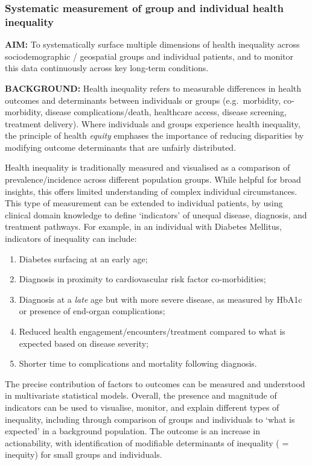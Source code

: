 \documentclass[
  letterpaper,
  DIV=11,
  numbers=noendperiod]{scrartcl}
\begin{document}
\subsubsection{Systematic measurement of group and individual health
inequality}\label{systematic-measurement-of-group-and-individual-health-inequality}

\textbf{AIM:} To systematically surface multiple dimensions of health
inequality across sociodemographic / geospatial groups and individual
patients, and to monitor this data continuously across key long-term
conditions.

\textbf{BACKGROUND:} Health inequality refers to measurable differences
in health outcomes and determinants between individuals or groups
(e.g.~morbidity, co-morbidity, disease complications/death, healthcare
access, disease screening, treatment delivery). Where individuals and
groups experience health inequality, the principle of health
\emph{equity} emphases the importance of reducing disparities by
modifying outcome determinants that are unfairly distributed.

Health inequality is traditionally measured and visualised as a
comparison of prevalence/incidence across different population groups.
While helpful for broad insights, this offers limited understanding of
complex individual circumstances. This type of measurement can be
extended to individual patients, by using clinical domain knowledge to
define `indicators' of unequal disease, diagnosis, and treatment
pathways. For example, in an individual with Diabetes Mellitus,
indicators of inequality can include:

\begin{enumerate}
\def\labelenumi{(\arabic{enumi})}
\item
  Diabetes surfacing at an early age;
\item
  Diagnosis in proximity to cardiovascular risk factor co-morbidities;
\item
  Diagnosis at a \emph{late} age but with more severe disease, as
  measured by HbA1c or presence of end-organ complications;
\item
  Reduced health engagement/encounters/treatment compared to what is
  expected based on disease severity;
\item
  Shorter time to complications and mortality following diagnosis.
\end{enumerate}

The precise contribution of factors to outcomes can be measured and
understood in multivariate statistical models. Overall, the presence and
magnitude of indicators can be used to visualise, monitor, and explain
different types of inequality, including through comparison of groups
and individuals to `what is expected' in a background population. The
outcome is an increase in actionability, with identification of
modifiable determinants of inequality ( = inequity) for small groups and
individuals.
\end{document}
